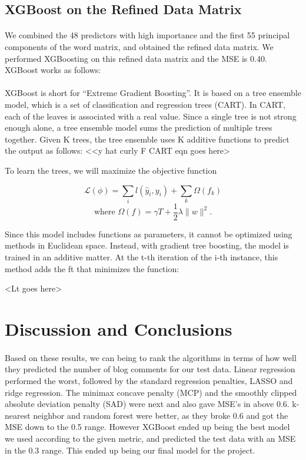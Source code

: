 \documentclass[paper=a4, fontsize=11pt]{scrartcl} %
\numberwithin{equation}{section} %
\numberwithin{figure}{section} %
\numberwithin{table}{section} %
\begin{document}
{\subsection{XGBoost on the Refined Data Matrix}
\paragraph{}
We combined the 48 predictors with high importance and the first 55 principal components of the word matrix, and obtained the refined data matrix. We performed XGBoosting on this refined data matrix and the MSE is 0.40. XGBoost works as follows:

\paragraph{}
XGBoost is short for “Extreme Gradient Boosting”. It is based on a tree ensemble model, which is a set of classification and regression trees (CART). In CART, each of the leaves is associated with a real value. Since a single tree is not strong enough alone, a tree ensemble model sums the prediction of multiple trees together. Given K trees, the tree ensemble uses K additive functions to predict the output as follows:
<<y hat  curly F CART eqn goes here>

To learn the trees, we will maximize the objective function

$$\mathcal{L}(\phi) = \sum_i l(\hat{y}_i, y_i) + \sum_k \Omega( f_k )$$
$$\text{where } \Omega( f ) = \gamma T + \frac{1}{2} \lambda \| w \|^2.$$

Since this model includes functions as parameters, it cannot be optimized using methods in Euclidean space. Instead, with gradient tree boosting, the model is trained in an additive matter. At the t-th iteration of the i-th instance, this method adds the ft that minimizes the function:

<Lt goes here>





%
%

\section{Discussion and Conclusions}

\paragraph{}
Based on these results, we can being to rank the algorithms in terms of how well they predicted the number of blog comments for our test data. Linear regression performed the worst, followed by the standard regression penalties, LASSO and ridge regression. The minimax concave penalty (MCP) and the smoothly clipped absolute deviation penalty (SAD) were next and also gave MSE’s in above 0.6. k-nearest neighbor and random forest were better, as they broke 0.6 and got the MSE down to the 0.5 range. However XGBoost ended up being the best model we used according to the given metric, and predicted the test data with an MSE in the 0.3 range. This ended up being our final model for the project.

}
\end{document}
